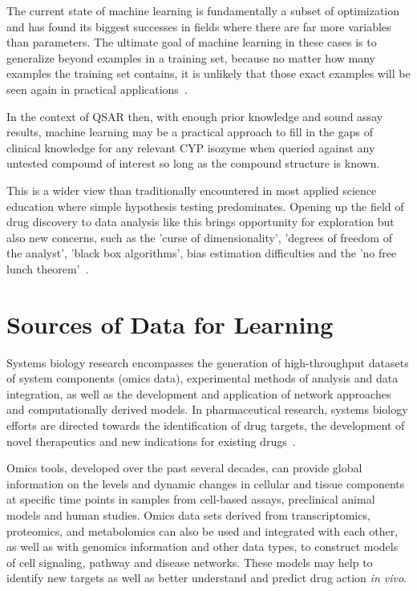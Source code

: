 The current state of machine learning is fundamentally a subset of optimization and has found its biggest successes in fields where there are far more variables than parameters. The ultimate goal of machine learning in these cases is to generalize beyond examples in a training set, because no matter how many examples the training set contains, it is unlikely that those exact examples will be seen again in practical applications~\cite{Domingos2012}. 

In the context of QSAR then, with enough prior knowledge and sound assay results, machine learning may be a practical approach to fill in the gaps of clinical knowledge for any relevant CYP isozyme when queried against any untested compound of interest so long as the compound structure is known.

This is a wider view than traditionally encountered in most applied science education where simple hypothesis testing predominates. Opening up the field of drug discovery to data analysis like this brings opportunity for exploration but also new concerns, such as the 'curse of dimensionality', 'degrees of freedom of the analyst', 'black box algorithms', bias estimation difficulties and the 'no free lunch theorem'~\cite{Boulesteix2014}.

\section{Sources of Data for Learning}

Systems biology research encompasses the generation of high-throughput datasets of system components (omics data), experimental methods of analysis and data integration, as well as the development and application of network approaches and computationally derived models. In pharmaceutical research, systems biology efforts are directed towards the identification of drug targets, the development of novel therapeutics and new indications for existing drugs~\cite{Berg2014}.

Omics tools, developed over the past several decades, can provide global information on the levels and dynamic changes in cellular and tissue components at specific time points in samples from cell-based assays, preclinical animal models and human studies. Omics data sets derived from transcriptomics, proteomics, and metabolomics can also be used and integrated with each other, as well as with genomics information and other data types, to construct models of cell signaling, pathway and disease networks. These models may help to identify new targets as well as better understand and predict drug action \textit{in vivo}.

